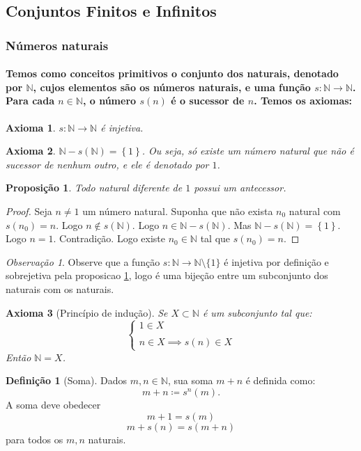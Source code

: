 \documentclass{article}
\theoremstyle{plain}
\newtheorem{axioma}{Axioma}
\newtheorem{prop}{Proposição}[section]
\theoremstyle{definition}
\newtheorem{definicao}{Definição}[section]
\theoremstyle{remark}
\newtheorem{obs}{Observação}[section]
\begin{document}
\subsection{Conjuntos Finitos e Infinitos}
\subsubsection{Números naturais}
\paragraph{Temos como conceitos primitivos o conjunto dos naturais, denotado por $\mathbb{N}$, cujos elementos são os números naturais, e uma função $s:\mathbb{N} \to \mathbb{N}$. Para cada $n\in \mathbb{N}$, o número $s(n)$ é o sucessor de $n$.  Temos os axiomas:}
\begin{axioma}
	$s:\mathbb{N} \to \mathbb{N}$ é injetiva.
\end{axioma}
\begin{axioma}
	$\mathbb{N} - s(\mathbb{N}) = \left\{ 1 \right\}$. Ou seja, só existe um número natural que não é sucessor de nenhum outro, e ele é denotado por $1$.
\end{axioma}
\begin{prop}
	\label{propsuc}
	Todo natural diferente de $1$ possui um antecessor.
\end{prop}
\begin{proof}
	Seja $n\neq 1$ um número natural. Suponha que não exista $n_0$ natural com $s(n_0) = n$. Logo $n \not \in s\left(\mathbb{N}\right)$. Logo $n\in \mathbb{N} - s(\mathbb{N})$. Mas $\mathbb{N} - s(\mathbb{N}) = \left\{ 1 \right\}$. Logo $n = 1$. Contradição. Logo existe  $n_0\in \mathbb{N}$ tal que $s(n_0) = n$.
\end{proof}
\begin{obs}
	Observe que a função $s: \mathbb{N} \to \mathbb{N}\setminus \{1\}$ é injetiva por definição e sobrejetiva pela proposicao \ref{propsuc}, logo é uma bijeção entre um subconjunto dos naturais com os naturais.
\end{obs}
\begin{axioma}[Princípio de indução]
	Se $X\subset \mathbb{N}$ é  um subconjunto tal que: 
	$$
	\begin{cases}
		1 \in X\\~\\
		n \in X \implies s(n) \in X
	\end{cases}
	$$
	Então $\mathbb{N} = X$.
\end{axioma}
\begin{definicao}[Soma]
	Dados $m,n\in \mathbb{N}$, sua soma $m+n$ é definida como:$$ m+n \coloneqq s^n(m).$$ A soma deve obedecer \begin{equation} m+1 = s(m)\end{equation} \begin{equation}m +s(n) = s(m+n)\end{equation}  para todos os $m,n$ naturais.
\end{definicao}
\end{document}
